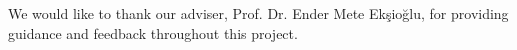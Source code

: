 We would like to thank our adviser, Prof. Dr. Ender Mete Ekşioğlu, for providing guidance and feedback throughout this project.